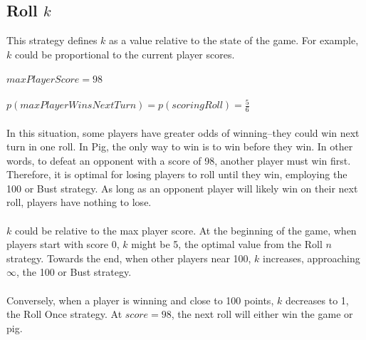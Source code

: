 \documentclass{article}
\begin{document}
\subsection*{Roll $k$}
This strategy defines $k$ as a value relative to the state of the game. For example, $k$ could be proportional to the current player scores.
\\\\
$maxPlayerScore = 98$
\\\\
$p(maxPlayerWinsNextTurn) = p(scoringRoll) = \frac{5}{6}$
\\\\
In this situation, some players have greater odds of winning--they could win next turn in one roll. In Pig, the only way to win is to win before they win. In other words, to defeat an opponent with a score of 98, another player must win first. Therefore, it is optimal for losing players to roll until they win, employing the 100 or Bust strategy. As long as an opponent player will likely win on their next roll, players have nothing to lose.
\\\\
$k$ could be relative to the max player score. At the beginning of the game, when players start with score 0, $k$ might be 5, the optimal value from the Roll $n$ strategy. Towards the end, when other players near 100, $k$ increases, approaching $\infty$, the 100 or Bust strategy.
\\\\
Conversely, when a player is winning and close to 100 points, $k$ decreases to 1, the Roll Once strategy. At $score = 98$, the next roll will either win the game or pig.
\end{document}
